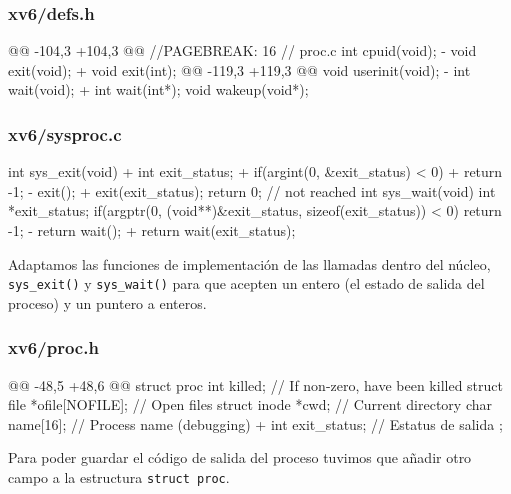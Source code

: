 \subsubsection{xv6/defs.h}
\begin{listing}
@@ -104,3 +104,3 @@
//PAGEBREAK: 16
// proc.c
    int             cpuid(void);
-   void            exit(void);
+   void            exit(int);
@@ -119,3 +119,3 @@
    void            userinit(void);
-   int             wait(void);
+   int             wait(int*);
    void            wakeup(void*);
\end{listing}

\subsubsection{xv6/sysproc.c}
\begin{listing}
    int
    sys_exit(void)
    {
+       int exit_status;
+       if(argint(0, &exit_status) < 0)
+           return -1;
-       exit();
+       exit(exit_status);
        return 0;  // not reached
    }
    int
    sys_wait(void)
    {
        int *exit_status;
        if(argptr(0, (void**)&exit_status, sizeof(exit_status)) < 0)
            return -1;
-       return wait();
+       return wait(exit_status);
    }
\end{listing}
\par Adaptamos las funciones de implementación de las llamadas dentro del núcleo, \\
\texttt{sys\_exit()} y \texttt{sys\_wait()} para que acepten un entero (el estado 
de salida del proceso) y un puntero a enteros.

\subsubsection{xv6/proc.h}
\begin{listing}
@@ -48,5 +48,6 @@ struct proc {
        int killed;                  // If non-zero, have been killed
        struct file *ofile[NOFILE];  // Open files
        struct inode *cwd;           // Current directory
        char name[16];               // Process name (debugging)
+       int exit_status;             // Estatus de salida
    };
\end{listing}
\par Para poder guardar el código de salida del proceso tuvimos que añadir otro campo a la estructura \texttt{struct proc}.

